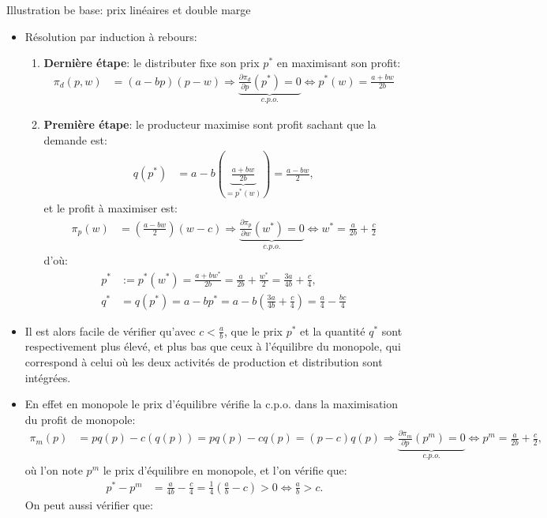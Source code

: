 \begin{frame}[allowframebreaks]{Illustration be base: prix linéaires et double marge}
\begin{itemize}
\item Résolution par induction à rebours:
\begin{enumerate}[$\star$]
\item \textbf{Dernière étape}: le distributer fixe son prix $p^*$ en maximisant son profit: 
\begin{align*}
    \pi_d(p, w) &= (a-bp)(p-w) \Rightarrow \underbrace{\frac{\partial \pi_d}{\partial p}(p^*) = 0}_{c.p.o.} \Leftrightarrow p^*(w) = \frac{a+bw}{2b}
\end{align*}
\item \textbf{Première étape}: le producteur maximise sont profit sachant que la demande est:
\begin{align*}
    q(p^*) &= a-b\left(\underbrace{\frac{a+bw}{2b}}_{=p^*(w)}\right) = \frac{a-bw}{2},
\end{align*}
et le profit à maximiser est:
\begin{align}
    \pi_p(w) &= \left(\frac{a-bw}{2}\right)(w - c) \Rightarrow \underbrace{\frac{\partial \pi_p}{\partial w}(w^*) = 0}_{c.p.o.} 
    \Leftrightarrow w^* = \frac{a}{2b} + \frac{c}{2} 
    \label{eq1}
\end{align}
d'où:
\begin{align}
p^* &:= p^*(w^*) = \frac{a+bw^*}{2b} = \frac{a}{2b} + \frac{w^*}{2} = \frac{3a}{4b} +\frac{c}{4}, \nonumber\\
q^* &= q(p^*) = a-bp^* = a-b\left(\frac{3a}{4b} +\frac{c}{4}\right)=\frac{a}{4} - \frac{bc}{4}
\label{eq2}
\end{align}
\end{enumerate}
\item Il est alors facile de vérifier qu'avec $c<\frac{a}{b}$,  que le prix $p^*$ et la quantité $q^*$ sont respectivement plus élevé, et plus bas 
que ceux à l'équilibre du monopole, qui correspond à celui où les deux activités de production et distribution sont intégrées.
\item En effet en monopole le prix d'équilibre vérifie la c.p.o. dans la maximisation du profit de monopole: 
\begin{align}
\pi_m(p) &= pq(p) - c(q(p)) = pq(p) - cq(p)= (p - c)q(p) \Rightarrow \underbrace{\frac{\partial \pi_m}{\partial p}(p^m) = 0 }_{c.p.o.} \Leftrightarrow p^m = \frac{a}{2b} + \frac{c}{2},
\label{eq3}
\end{align}
où l'on note $p^m$ le prix d'équilibre en monopole, et l'on vérifie que:
\begin{align*}
p^* - p^m &= \frac{a}{4b} - \frac{c}{4} = \frac{1}{4}\left(\frac{a}{b}- c\right) > 0 \Leftrightarrow \frac{a}{b} > c.
\end{align*}
On peut aussi vérifier que:


\end{itemize}
\end{frame}

